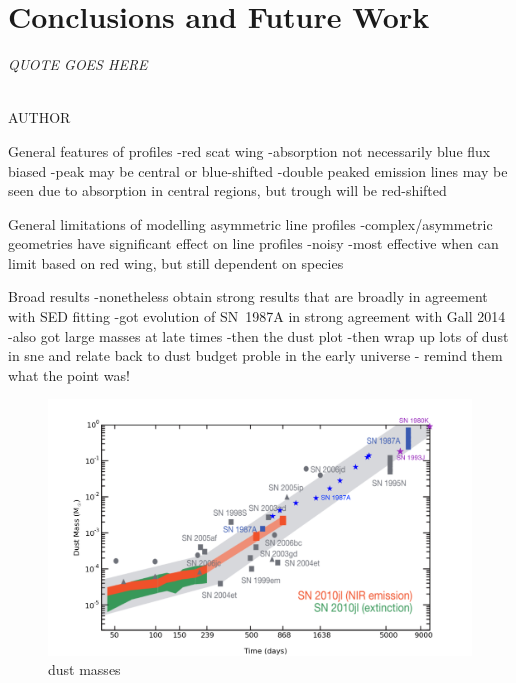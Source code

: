 \chapter{Conclusions and Future Work}\label{chp:chp7}

\begin{flushright}
  {\em QUOTE GOES HERE }\\

\ \

\normalsize
{AUTHOR}  
\end{flushright}



General features of profiles
-red scat wing
-absorption not necessarily blue flux biased
-peak may be central or blue-shifted
-double peaked emission lines may be seen due to absorption in central regions, but trough will be red-shifted

General limitations of modelling asymmetric line profiles
-complex/asymmetric geometries have significant effect on line profiles
-noisy
-most effective when can limit based on red wing, but still dependent on species
 
Broad results
-nonetheless obtain strong results that are broadly in agreement with SED fitting
-got evolution of SN~1987A in strong agreement with Gall 2014
-also got large masses at late times
-then the dust plot
-then wrap up lots of dust in sne and relate back to dust budget proble in the early universe - remind them what the point was!

\begin{figure}
\centering
\includegraphics[scale=0.5,clip=true, trim=50 0 60 30]{chapters/chapter7/figs/final_dust_plot.png}
\caption{dust masses}
\label{shifted}
\end{figure}